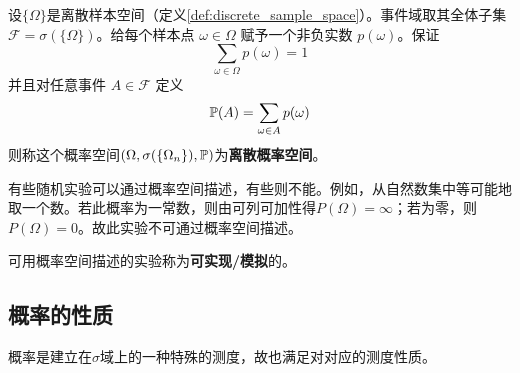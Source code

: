\begin{example}[离散概率空间]
    设$\{ \Omega \}$是离散样本空间（定义\ref{def:discrete_sample_space}）。事件域取其全体子集$\mathcal{F}=\sigma(\{ \Omega \})$。给每个样本点 $\omega \in \Omega$ 赋予一个非负实数 $p(\omega)$。保证
    \[ \sum_{\omega \in \Omega} p(\omega)=1 \]
    并且对任意事件 $A \in \mathcal{F}$ 定义
    \[ \P(A)=\sum_{\omega \in A} p(\omega) \]
    则称这个概率空间$(\Omega, \sigma(\{ \Omega_n \}),\P)$为\textbf{离散概率空间}。
\end{example}

有些随机实验可以通过概率空间描述，有些则不能。例如，从自然数集中等可能地取一个数。若此概率为一常数，则由可列可加性得$P(\Omega)=\infty$；若为零，则$P(\Omega)=0$。故此实验不可通过概率空间描述。

可用概率空间描述的实验称为\textbf{可实现/模拟}的。

\subsection{概率的性质}

概率是建立在$\sigma$域上的一种特殊的测度，故也满足对对应的测度性质。

